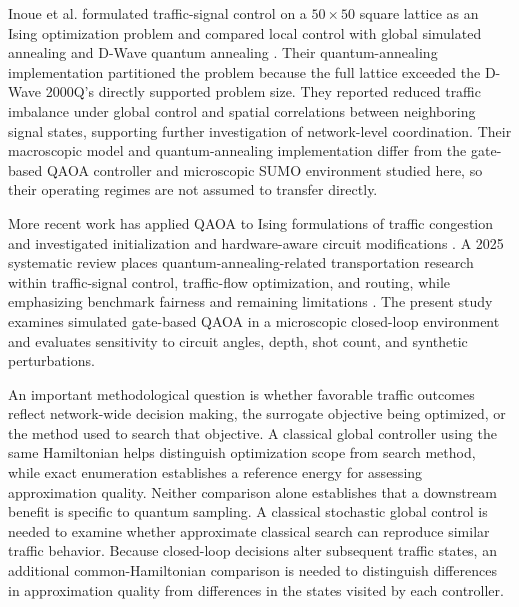 Inoue et al. formulated traffic-signal control on a $50\times50$ square lattice as an Ising optimization problem and compared local control with global simulated annealing and D-Wave quantum annealing \cite{inoue2021}. Their quantum-annealing implementation partitioned the problem because the full lattice exceeded the D-Wave 2000Q's directly supported problem size. They reported reduced traffic imbalance under global control and spatial correlations between neighboring signal states, supporting further investigation of network-level coordination. Their macroscopic model and quantum-annealing implementation differ from the gate-based QAOA controller and microscopic SUMO environment studied here, so their operating regimes are not assumed to transfer directly.

More recent work has applied QAOA to Ising formulations of traffic congestion and investigated initialization and hardware-aware circuit modifications \cite{villanueva2025}. A 2025 systematic review places quantum-annealing-related transportation research within traffic-signal control, traffic-flow optimization, and routing, while emphasizing benchmark fairness and remaining limitations \cite{mohammed2025}. The present study examines simulated gate-based QAOA in a microscopic closed-loop environment and evaluates sensitivity to circuit angles, depth, shot count, and synthetic perturbations.

An important methodological question is whether favorable traffic outcomes reflect network-wide decision making, the surrogate objective being optimized, or the method used to search that objective. A classical global controller using the same Hamiltonian helps distinguish optimization scope from search method, while exact enumeration establishes a reference energy for assessing approximation quality. Neither comparison alone establishes that a downstream benefit is specific to quantum sampling. A classical stochastic global control is needed to examine whether approximate classical search can reproduce similar traffic behavior. Because closed-loop decisions alter subsequent traffic states, an additional common-Hamiltonian comparison is needed to distinguish differences in approximation quality from differences in the states visited by each controller.

